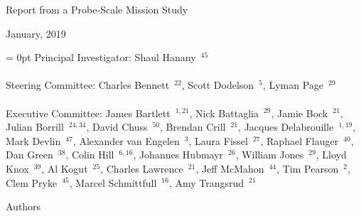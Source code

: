 \documentclass[PICOReport.tex]{subfiles}
\begin{document}
%
%
%
%
\Large{ \centerline{Report from a Probe-Scale Mission Study}}
\large{ \centerline{January, 2019 }}
\vspace{3pt} 

\parindent = 0pt
\small{
Principal Investigator: Shaul Hanany~$^{45}$ } \\
\vspace{-7pt} \\
\small{
Steering Committee: Charles Bennett~$^{22}$, Scott Dodelson~$^{5}$, Lyman Page~$^{29}$ } \\
\vspace{-7pt} \\
\small{
Executive Committee: 
James Bartlett~$^{1,21}$,
Nick Battaglia~$^{29}$,
Jamie Bock~$^{21}$, 
Julian Borrill~$^{24,34}$, 
David Chuss~$^{50}$,
Brendan Crill~$^{21}$, 
Jacques Delabrouille~$^{1,19}$,
Mark Devlin~$^{47}$, 
Alexander van Engelen~$^3$,
Laura Fissel~$^{27}$,
Raphael Flauger~$^{40}$, 
Dan Green~$^{38}$,
Colin Hill~$^{6,16}$,
Johannes Hubmayr~$^{26}$,
William Jones~$^{29}$, 
Lloyd Knox~$^{39}$, 
Al Kogut~$^{25}$, 
Charles Lawrence~$^{21}$, 
Jeff McMahon~$^{44}$, 
Tim Pearson~$^{2}$,
Clem Pryke~$^{45}$, 
Marcel Schmittfull~$^{16}$,
Amy Trangsrud~$^{21}$ \\
}

\label{authorlist}

\Large  {\centerline {Authors}}
\end{document}
